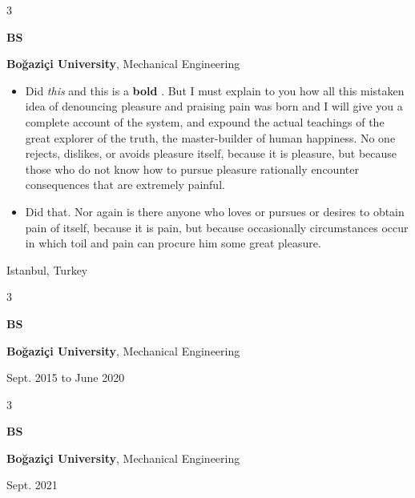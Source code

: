 \documentclass[10pt, letterpaper]{article}
\newenvironment{highlights}{
    \begin{itemize}[
        topsep=0.10 cm,
        parsep=0.10 cm,
        partopsep=0pt,
        itemsep=0pt,
        leftmargin=0.4 cm + 10pt
    ]
}{
    \end{itemize}
} %
\newenvironment{threecolentry}[3][]{
    \onecolentry
    \def\thirdColumn{#3}
    \setcolumnwidth{1 cm, \fill, 4.5 cm}
    \begin{paracol}{3}
    {\raggedright #2} \switchcolumn
}{
    \switchcolumn \raggedleft \thirdColumn
    \end{paracol}
    \endonecolentry
} %
\let\hrefWithoutArrow\href
\renewcommand{\href}[2]{\hrefWithoutArrow{#1}{\mbox{\ifthenelse{\equal{#2}{}}{ }{#2 }\raisebox{.15ex}{\footnotesize \faExternalLink*}}}}
\begin{document}
        \vspace{0.2 cm}

        \begin{threecolentry}{\textbf{BS}}{
            Istanbul, Turkey
        }
            \textbf{Boğaziçi University}, Mechanical Engineering
            \begin{highlights}
                \item Did \textit{this} and this is a \textbf{bold} \href{https://example.com}{link}. But I must explain to you how all this mistaken idea of denouncing pleasure and praising pain was born and I will give you a complete account of the system, and expound the actual teachings of the great explorer of the truth, the master-builder of human happiness. No one rejects, dislikes, or avoids pleasure itself, because it is pleasure, but because those who do not know how to pursue pleasure rationally encounter consequences that are extremely painful.
                \item Did that. Nor again is there anyone who loves or pursues or desires to obtain pain of itself, because it is pain, but because occasionally circumstances occur in which toil and pain can procure him some great pleasure.
            \end{highlights}
        \end{threecolentry}

        \vspace{0.2 cm}

        \begin{threecolentry}{\textbf{BS}}{
            Sept. 2015 to June 2020
        }
            \textbf{Boğaziçi University}, Mechanical Engineering
        \end{threecolentry}

        \vspace{0.2 cm}

        \begin{threecolentry}{\textbf{BS}}{
            Sept. 2021
        }
            \textbf{Boğaziçi University}, Mechanical Engineering
        \end{threecolentry}

        \vspace{0.2 cm}
\end{document}
